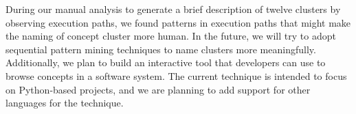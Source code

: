 During our manual analysis to generate a brief description of twelve clusters by observing execution paths, we found patterns in execution paths that might make the naming of concept cluster more human. In the future, we will try to adopt sequential pattern mining techniques to name clusters more meaningfully. Additionally, we plan to build an interactive tool that developers can use to browse concepts in a software system. The current technique is intended to focus on Python-based projects, and we are planning to add support for other languages for the technique.

